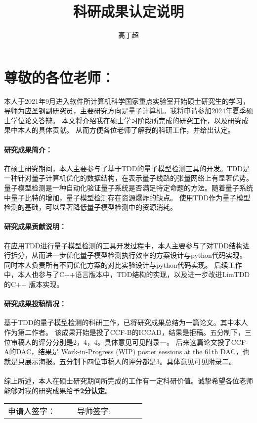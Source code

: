 \documentclass[10.5pt]{article} %
\title{科研成果认定说明} %
\author{高丁超} %
\date{} %
\begin{document}
\maketitle %
\thispagestyle{empty}
\section*{尊敬的各位老师：} %

本人于2021年9月进入软件所计算机科学国家重点实验室开始硕士研究生的学习，导师为应圣钢副研究员，主要研究方向是量子计算机。我将申请参加2024年夏季硕士学位论文答辩。
本文将介绍我在硕士学习阶段所完成的研究工作，以及研究成果中本人的具体贡献。
从而方便各位老师了解我的科研工作，并给出认定。


\paragraph*{研究成果简介：} %
在硕士研究期间，本人主要参与了基于TDD的量子模型检测工具的开发。TDD是一种针对量子计算机优化的数据结构，在表示量子线路的张量网络上有显著优势。
量子模型检测是一种自动化验证量子系统是否满足特定命题的方法。随着量子系统中量子比特的增加，量子模型检测存在资源爆炸的缺点。
使用TDD作为量子模型检测的基础，可以显著降低量子模型检测中的资源消耗。

\paragraph*{研究成果贡献说明：}在应用TDD进行量子模型检测的工具开发过程中，本人主要参与了对TDD结构进行拆分，从而进一步优化量子模型检测执行效率的方案设计与python代码实现。
同时本人负责所有不同优化方案的对比实验设计与python代码实现。
后续工作中，本人也参与了C++语言版本中，TDD结构的实现，以及进一步改进LimTDD的C++ 版本实现。

\paragraph*{研究成果投稿情况：}
基于TDD的量子模型检测的科研工作，已将研究成果总结为一篇论文。其中本人作为第二作者。
该成果开始是投了CCF-B的ICCAD，结果是拒稿。五分制下，三位审稿人的评分分别是2，4，4。具体意见可见附录一。
后来这篇论文投了CCF-A的DAC，结果是 Work-in-Progress (WIP) poster sessions at the 61th DAC，也就是只展示海报。五分制下四位审稿人的评分都是3。具体意见可见附录二。

\paragraph*{}
\setlength{\parindent}{0pt}
综上所述，本人在硕士研究期间所完成的工作有一定科研价值。诚挚希望各位老师能够对我的研究成果给予\textbf{2分认定}。\\[0.5cm]
\begin{tabular}{p{0.4\linewidth} p{0.4\linewidth}}
    申请人签字： & \centering 导师签字: \\
\end{tabular}
\end{document}
